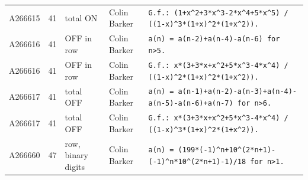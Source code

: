\documentclass[11pt]{article}
\theoremstyle{definition}
\theoremstyle{remark}
\begin{document}
{\begin{longtable}{p{1.3cm}p{0.7cm}p{2.4cm}p{2.3cm}p{7.3cm}}
A266615 & 41 & total ON & Colin Barker & \texttt{G.f.: \allowbreak{}(1+\allowbreak{}x\^{}2+\allowbreak{}3*\allowbreak{}x\^{}3-\allowbreak{}2*\allowbreak{}x\^{}4+\allowbreak{}5*\allowbreak{}x\^{}5)\allowbreak{} \allowbreak{}/\allowbreak{} \allowbreak{}((1-\allowbreak{}x)\allowbreak{}\^{}3*\allowbreak{}(1+\allowbreak{}x)\allowbreak{}\^{}2*\allowbreak{}(1+\allowbreak{}x\^{}2)\allowbreak{})\allowbreak{}.} \\
A266616 & 41 & OFF in row & Colin Barker & \texttt{a(n)\allowbreak{} \allowbreak{}=\allowbreak{} \allowbreak{}a(n-\allowbreak{}2)\allowbreak{}+\allowbreak{}a(n-\allowbreak{}4)\allowbreak{}-\allowbreak{}a(n-\allowbreak{}6)\allowbreak{} \allowbreak{}for \allowbreak{}n>5.} \\
A266616 & 41 & OFF in row & Colin Barker & \texttt{G.f.: \allowbreak{}x*\allowbreak{}(3+\allowbreak{}3*\allowbreak{}x+\allowbreak{}x\^{}2+\allowbreak{}5*\allowbreak{}x\^{}3-\allowbreak{}4*\allowbreak{}x\^{}4)\allowbreak{} \allowbreak{}/\allowbreak{} \allowbreak{}((1-\allowbreak{}x)\allowbreak{}\^{}2*\allowbreak{}(1+\allowbreak{}x)\allowbreak{}\^{}2*\allowbreak{}(1+\allowbreak{}x\^{}2)\allowbreak{})\allowbreak{}.} \\
A266617 & 41 & total OFF & Colin Barker & \texttt{a(n)\allowbreak{} \allowbreak{}=\allowbreak{} \allowbreak{}a(n-\allowbreak{}1)\allowbreak{}+\allowbreak{}a(n-\allowbreak{}2)\allowbreak{}-\allowbreak{}a(n-\allowbreak{}3)\allowbreak{}+\allowbreak{}a(n-\allowbreak{}4)\allowbreak{}-\allowbreak{}a(n-\allowbreak{}5)\allowbreak{}-\allowbreak{}a(n-\allowbreak{}6)\allowbreak{}+\allowbreak{}a(n-\allowbreak{}7)\allowbreak{} \allowbreak{}for \allowbreak{}n>6.} \\
A266617 & 41 & total OFF & Colin Barker & \texttt{G.f.: \allowbreak{}x*\allowbreak{}(3+\allowbreak{}3*\allowbreak{}x+\allowbreak{}x\^{}2+\allowbreak{}5*\allowbreak{}x\^{}3-\allowbreak{}4*\allowbreak{}x\^{}4)\allowbreak{} \allowbreak{}/\allowbreak{} \allowbreak{}((1-\allowbreak{}x)\allowbreak{}\^{}3*\allowbreak{}(1+\allowbreak{}x)\allowbreak{}\^{}2*\allowbreak{}(1+\allowbreak{}x\^{}2)\allowbreak{})\allowbreak{}.} \\
A266660 & 47 & row, binary digits & Colin Barker & \texttt{a(n)\allowbreak{} \allowbreak{}=\allowbreak{} \allowbreak{}(199*\allowbreak{}(-\allowbreak{}1)\allowbreak{}\^{}n+\allowbreak{}10\^{}(2*\allowbreak{}n+\allowbreak{}1)\allowbreak{}-\allowbreak{}(-\allowbreak{}1)\allowbreak{}\^{}n*\allowbreak{}10\^{}(2*\allowbreak{}n+\allowbreak{}1)\allowbreak{}-\allowbreak{}1)\allowbreak{}/\allowbreak{}18 \allowbreak{}for \allowbreak{}n>1.} \\

\end{longtable}}
\end{document}
